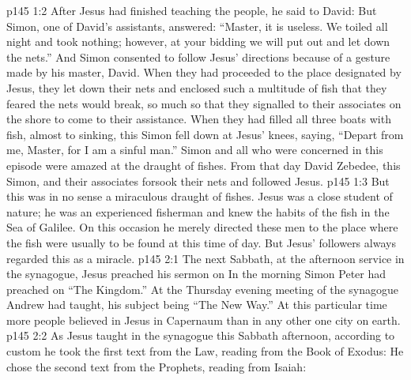 \vs p145 1:2 After Jesus had finished teaching the people, he said to David:  But Simon, one of David’s assistants, answered: “Master, it is useless. We toiled all night and took nothing; however, at your bidding we will put out and let down the nets.” And Simon consented to follow Jesus’ directions because of a gesture made by his master, David. When they had proceeded to the place designated by Jesus, they let down their nets and enclosed such a multitude of fish that they feared the nets would break, so much so that they signalled to their associates on the shore to come to their assistance. When they had filled all three boats with fish, almost to sinking, this Simon fell down at Jesus’ knees, saying, “Depart from me, Master, for I am a sinful man.” Simon and all who were concerned in this episode were amazed at the draught of fishes. From that day David Zebedee, this Simon, and their associates forsook their nets and followed Jesus.
\vs p145 1:3 But this was in no sense a miraculous draught of fishes. Jesus was a close student of nature; he was an experienced fisherman and knew the habits of the fish in the Sea of Galilee. On this occasion he merely directed these men to the place where the fish were usually to be found at this time of day. But Jesus’ followers always regarded this as a miracle.
\vs p145 2:1 The next Sabbath, at the afternoon service in the synagogue, Jesus preached his sermon on  In the morning Simon Peter had preached on “The Kingdom.” At the Thursday evening meeting of the synagogue Andrew had taught, his subject being “The New Way.” At this particular time more people believed in Jesus in Capernaum than in any other one city on earth.
\vs p145 2:2 As Jesus taught in the synagogue this Sabbath afternoon, according to custom he took the first text from the Law, reading from the Book of Exodus:  He chose the second text from the Prophets, reading from Isaiah: 
